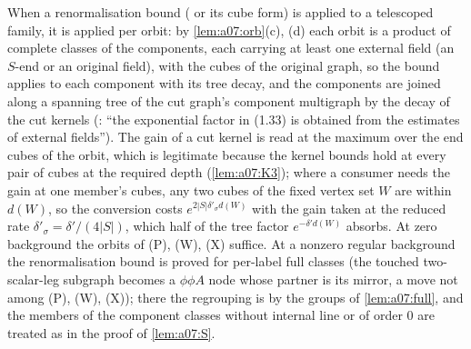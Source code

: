 \begin{remark}\label{rem:a07:use}
When a renormalisation bound (\cite[Prop.~1, (1.33)]{Ba3} or its cube form) is applied to a telescoped family, it is applied per orbit: by \cref{lem:a07:orb}(c), (d) each orbit is a product of complete classes of the components, each carrying at least one external field (an $S$-end or an original field), with the cubes of the original graph, so the bound applies to each component with its tree decay, and the components are joined along a spanning tree of the cut graph's component multigraph by the decay of the cut kernels (\cite[(3.2), p.~432]{Ba3}: ``the exponential factor in (1.33) is obtained from the estimates of external fields''). The gain of a cut kernel is read at the maximum over the end cubes of the orbit, which is legitimate because the kernel bounds hold at every pair of cubes at the required depth (\cref{lem:a07:K3}); where a consumer needs the gain at one member's cubes, any two cubes of the fixed vertex set $W$ are within $d(W)$, so the conversion costs $e^{2|S|\delta'_\sigma d(W)}$ with the gain taken at the reduced rate $\delta'_\sigma=\delta'/(4|S|)$, which half of the tree factor $e^{-\delta'd(W)}$ absorbs. At zero background the orbits of (P), (W), (X) suffice. At a nonzero regular background the renormalisation bound is proved for per-label full classes (the touched two-scalar-leg subgraph becomes a $\phi\phi A$ node whose partner is its mirror, a move not among (P), (W), (X)); there the regrouping is by the groups of \cref{lem:a07:full}, and the members of the component classes without internal line or of order $0$ are treated as in the proof of \cref{lem:a07:S}.
\end{remark}

